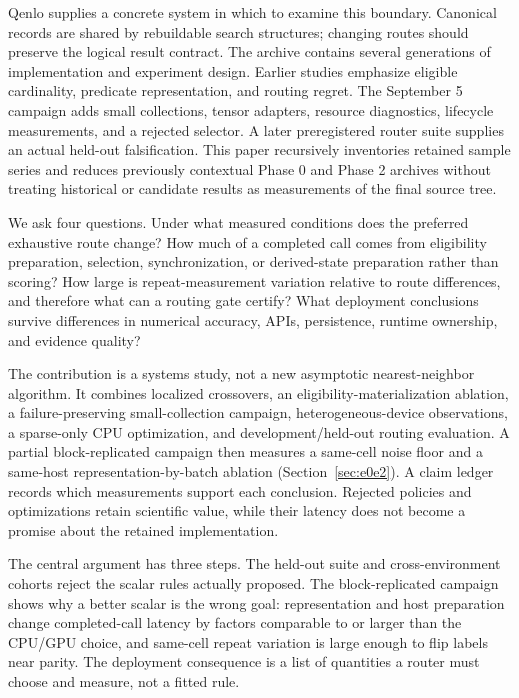 \documentclass[10pt]{article}
\begin{document}
Qenlo supplies a concrete system in which to examine this boundary. Canonical records are shared by rebuildable search structures; changing routes should preserve the logical result contract. The archive contains several generations of implementation and experiment design. Earlier studies emphasize eligible cardinality, predicate representation, and routing regret. The September 5 campaign adds small collections, tensor adapters, resource diagnostics, lifecycle measurements, and a rejected selector. A later preregistered router suite supplies an actual held-out falsification. This paper recursively inventories retained sample series and reduces previously contextual Phase 0 and Phase 2 archives without treating historical or candidate results as measurements of the final source tree.

We ask four questions. Under what measured conditions does the preferred exhaustive route change? How much of a completed call comes from eligibility preparation, selection, synchronization, or derived-state preparation rather than scoring? How large is repeat-measurement variation relative to route differences, and therefore what can a routing gate certify? What deployment conclusions survive differences in numerical accuracy, APIs, persistence, runtime ownership, and evidence quality?

The contribution is a systems study, not a new asymptotic nearest-neighbor algorithm. It combines localized crossovers, an eligibility-materialization ablation, a failure-preserving small-collection campaign, heterogeneous-device observations, a sparse-only CPU optimization, and development/held-out routing evaluation. A partial block-replicated campaign then measures a same-cell noise floor and a same-host representation-by-batch ablation (Section~\ref{sec:e0e2}). A claim ledger records which measurements support each conclusion. Rejected policies and optimizations retain scientific value, while their latency does not become a promise about the retained implementation.

The central argument has three steps. The held-out suite and cross-environment cohorts reject the scalar rules actually proposed. The block-replicated campaign shows why a better scalar is the wrong goal: representation and host preparation change completed-call latency by factors comparable to or larger than the CPU/GPU choice, and same-cell repeat variation is large enough to flip labels near parity. The deployment consequence is a list of quantities a router must choose and measure, not a fitted rule.
\end{document}
